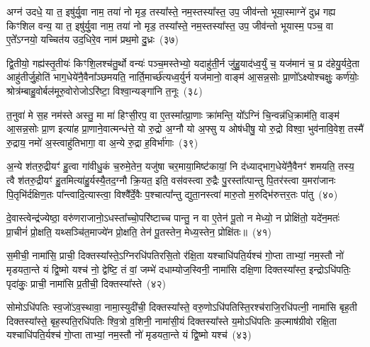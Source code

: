 {\anuvakamend[{श्यै॒त॒त्वं प्र॒तीच्या᳚ त्वा दि॒शा सा॑दयामि॒ यः सात्मा॑नञ्चिनु॒ते द्वाविꣳ॑शतिश्च}]}%

अग्न॑ उदधे॒ या त॒ इषु॑र्यु॒वा नाम॒ तया॑ नो मृड॒ तस्या᳚स्ते॒ नम॒स्तस्या᳚स्त॒ उप॒ जीव॑न्तो भूया॒स्माग्ने॑ दुध्र गह्य किꣳशिल वन्य॒ या त॒ इषु॑र्यु॒वा नाम॒ तया॑ नो मृड॒ तस्या᳚स्ते॒ नम॒स्तस्या᳚स्त॒ उप॒ जीव॑न्तो भूयास्म॒ पञ्च॒ वा ए॒ते᳚\-ऽग्नयो॒ यच्चित॑य उद॒धिरे॒व नाम॑ प्रथ॒मो दु॒ध्रः~(३७)

द्वि॒तीयो॒ गह्य॑स्तृ॒तीयः॑ किꣳशि॒लश्च॑तु॒र्थो वन्यः॑ पञ्च॒मस्तेभ्यो॒ यदाहु॑ती॒र्न जु॑हु॒याद॑ध्व॒र्युं च॒ यज॑मानं च॒ प्र द॑हेयु॒र्यदे॒ता आहु॑तीर्जु॒होति॑ भाग॒धेये॑नै॒वैना᳚ञ्छमयति॒ नार्ति॒मार्च्छ॑त्यध्व॒र्युर्न यज॑मानो॒ वाङ्म॑ आ॒सन्न॒सोः प्रा॒णो᳚\-ऽक्ष्योश्चक्षुः॒ कर्ण॑योः॒ श्रोत्र॑म्बाहु॒वोर्बल॑मूरु॒वोरोजो\-ऽरि॑ष्टा॒ विश्वा॒न्यङ्गा॑नि त॒नूः~(३८)

त॒नुवा॑ मे स॒ह नम॑स्ते अस्तु॒ मा मा॑ हिꣳसी॒रप॒ वा ए॒तस्मा᳚त्प्रा॒णाः क्रा॑मन्ति॒ यो᳚\-ऽग्निं चि॒न्वन्न॑धि॒क्राम॑ति॒ वाङ्म॑ आ॒सन्न॒सोः प्रा॒ण इत्या॑ह प्रा॒णाने॒वात्मन्ध॑त्ते॒ यो रु॒द्रो अ॒ग्नौ यो अ॒फ्सु य ओष॑धीषु॒ यो रु॒द्रो विश्वा॒ भुव॑नावि॒वेश॒ तस्मै॑ रु॒द्राय॒ नमो॑ अ॒स्त्वाहु॑तिभागा॒ वा अ॒न्ये रु॒द्रा ह॒विर्भा॑गाः~(३९)

अ॒न्ये श॑तरु॒द्रीयꣳ॑ हु॒त्वा गा॑वीधु॒कं च॒रुमे॒तेन॒ यजु॑षा चर॒माया॒मिष्ट॑कायां॒ नि द॑ध्याद्भाग॒धेये॑नै॒वैनꣳ॑ शमयति॒ तस्य॒ त्वै श॑तरु॒द्रीयꣳ॑ हु॒तमित्या॑हु॒र्यस्यै॒तद॒ग्नौ क्रि॒यत॒ इति॒ वस॑वस्त्वा रु॒द्रैः पु॒रस्ता᳚त्पान्तु पि॒तर॑स्त्वा य॒मरा॑जानः पि॒तृभि॑र्दक्षिण॒तः पा᳚न्त्वादि॒त्यास्त्वा॒ विश्वै᳚र्दे॒वैः प॒श्चात्पा᳚न्तु द्युता॒नस्त्वा॑ मारु॒तो म॒रुद्भि॑रुत्तर॒तः पा॑तु~(४०)

दे॒वास्त्वेन्द्र॑ज्येष्ठा॒ वरु॑णराजानो॒\-ऽधस्ता᳚च्चो॒परि॑ष्टाच्च पान्तु॒ न वा ए॒तेन॑ पू॒तो न मेध्यो॒ न प्रोक्षि॑तो॒ यदे॑न॒मतः॑ प्रा॒चीनं॑ प्रो॒क्षति॒ यथ्सञ्चि॑त॒माज्ये॑न प्रो॒क्षति॒ तेन॑ पू॒तस्तेन॒ मेध्य॒स्तेन॒ प्रोक्षि॑तः॥~(४१)

{\anuvakamend[{दु॒ध्रस्त॒नूर्\mbox{}ह॒विर्भा॑गाः पातु॒ द्वात्रिꣳ॑शच्च}]}%

स॒मीची॒ नामा॑सि॒ प्राची॒ दिक्तस्या᳚स्ते॒\-ऽग्निरधि॑पतिरसि॒तो र॑क्षि॒ता यश्चाधि॑पति॒र्यश्च॑ गो॒प्ता ताभ्यां॒ नम॒स्तौ नो॑ मृडयता॒न्ते यं द्वि॒ष्मो यश्च॑ नो॒ द्वेष्टि॒ तं वां॒ जम्भे॑ दधाम्योज॒स्विनी॒ नामा॑सि दक्षि॒णा दिक्तस्या᳚स्त॒ इन्द्रो\-ऽधि॑पतिः॒ पृदा॑कुः॒ प्राची॒ नामा॑सि प्र॒तीची॒ दिक्तस्या᳚स्ते~(४२)

सोमो\-ऽधि॑पतिः स्व॒जो॑\-ऽव॒स्थावा॒ नामा॒स्युदी॑ची॒ दिक्तस्या᳚स्ते॒ वरु॒णो\-ऽधि॑पतिस्ति॒रश्च॑राजि॒रधि॑पत्नी॒ नामा॑सि बृह॒ती दिक्तस्या᳚स्ते॒ बृह॒स्पति॒रधि॑पतिः श्वि॒त्रो व॒शिनी॒ नामा॑सी॒यं दिक्तस्या᳚स्ते य॒मो\-ऽधि॑पतिः क॒ल्माष॑ग्रीवो रक्षि॒ता यश्चाधि॑पति॒र्यश्च॑ गो॒प्ता ताभ्यां॒ नम॒स्तौ नो॑ मृडयता॒न्ते यं द्वि॒ष्मो यश्च॑~(४३)

